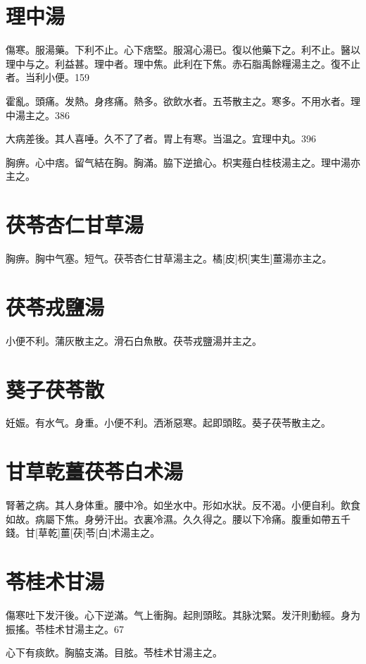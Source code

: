 \documentclass[12pt,twoside,UTF8,b5paper]{ctexbook}
\begin{document}
\section{理中湯}

傷寒。服湯藥。下利不止。心下痞堅。服瀉心湯已。復以他藥下之。利不止。醫以理中与之。利益甚。理中者。理中焦。此利在下焦。赤石脂禹餘糧湯主之。復不止者。当利小便。159

霍亂。頭痛。发熱。身疼痛。熱多。欲飲水者。五苓散主之。寒多。不用水者。理中湯主之。386

大病差後。其人喜唾。久不了了者。胃上有寒。当温之。宜理中丸。396

胸痹。心中痞。留气結在胸。胸滿。脇下逆搶心。枳実薤白桂枝湯主之。理中湯亦主之。

\section{茯苓杏仁甘草湯}

胸痹。胸中气塞。短气。茯苓杏仁甘草湯主之。橘[皮]枳[実生]薑湯亦主之。

\section{茯苓戎鹽湯}

小便不利。蒲灰散主之。滑石白魚散。茯苓戎鹽湯并主之。

\section{葵子茯苓散}

妊娠。有水气。身重。小便不利。洒淅惡寒。起即頭眩。葵子茯苓散主之。

\section{甘草乾薑茯苓白术湯}

腎著之病。其人身体重。腰中冷。如坐水中。形如水狀。反不渴。小便自利。飲食如故。病屬下焦。身勞汗出。衣裏冷濕。久久得之。腰以下冷痛。腹重如帶五千錢。甘[草乾]薑[茯]苓[白]术湯主之。

\section{苓桂术甘湯}

傷寒吐下发汗後。心下逆滿。气上衝胸。起則頭眩。其脉沈緊。发汗則動經。身为振搖。苓桂术甘湯主之。67

心下有痰飲。胸脇支滿。目胘。苓桂术甘湯主之。
\end{document}
